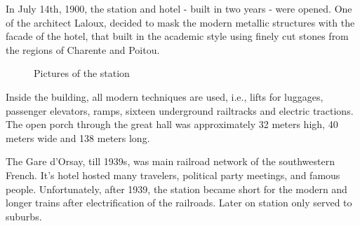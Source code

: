 \documentclass[
10pt, %
a4paper, %
oneside, %
headinclude,footinclude, %
BCOR5mm, %
]{scrartcl}
\theoremstyle{definition} %
\theoremstyle{plain} %
\theoremstyle{remark} %
\begin{document}
In July 14th, 1900, the station and hotel - built in two years - were opened. One of the architect Laloux, decided to mask the modern metallic structures with the facade of the hotel, that built in the academic style using finely cut stones from the regions of Charente and Poitou.

\begin{figure}[tbh]
\centering

\quad
{} \quad
{}

\caption[Pictures of the station]{Pictures of the station} %
\label{fig:station}
\end{figure}

Inside the building, all modern techniques are used, i.e., lifts for luggages, passenger elevators, ramps, sixteen underground railtracks and electric tractions. The open porch through the great hall was approximately 32 meters high, 40 meters wide and 138 meters long.

The Gare d'Orsay, till 1939s, was main railroad network of the southwestern French. It's hotel hosted many travelers, political party meetings, and famous people. Unfortunately, after 1939, the station became short for the modern and longer trains after electrification of the railroads. Later on station only served to suburbs. 
\end{document}
